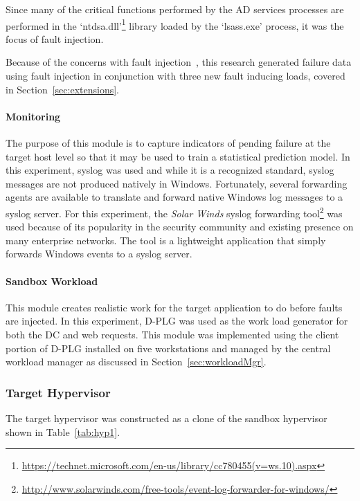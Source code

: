 Since many of the critical functions performed by the \ac{AD} services
processes are performed in the
`ntdsa.dll'\footnote{\url{https://technet.microsoft.com/en-us/library/cc780455(v=ws.10).aspx}}
library loaded by the `lsass.exe' process, it was the focus of fault injection.

Because of the concerns with fault
injection~\citep{cotroneo2012,kikuchi2014,natella2010}, this research generated
failure data using fault injection in conjunction with three new fault inducing
loads, covered in Section~\ref{sec:extensions}.

\paragraph{Monitoring} \label{sec:sandboxMonitoringTool} 
The purpose of this module is to capture indicators of pending failure at the
target host level so that it may be used to train a statistical prediction
model.  In this experiment, syslog was used and while it is a recognized
standard, syslog messages are not produced natively in Windows.  Fortunately,
several forwarding agents are available to translate and forward native Windows
log messages to a syslog server.  For this experiment, the \emph{Solar Winds}
syslog forwarding
tool\footnote{\url{http://www.solarwinds.com/free-tools/event-log-forwarder-for-windows/}}
was used because of its popularity in the security community and existing
presence on many enterprise networks.  The tool is a lightweight application
that simply forwards Windows events to a syslog server.

\paragraph{Sandbox Workload}  \label{sec:sandboxWorkload} 
This module creates realistic work for the target application to do before
faults are injected.  In this experiment, \ac{D-PLG} was used as the work load
generator for both the \ac{DC} and web requests.  This module was implemented
using the client portion of \ac{D-PLG} installed on five workstations and
managed by the central workload manager as discussed in
Section~\ref{sec:workloadMgr}.

\subsubsection{Target Hypervisor} \label{sec:target}
The target hypervisor was constructed as a clone of the sandbox hypervisor
shown in Table~\ref{tab:hyp1}. 

